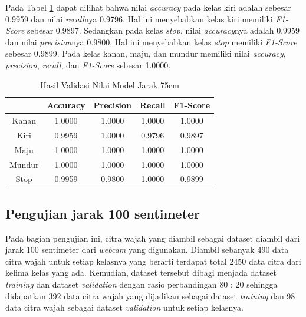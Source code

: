 Pada Tabel \ref{tb:Hasil Validasi Nilai Model Jarak 75cm} dapat dilihat bahwa nilai \emph{accuracy} pada kelas kiri adalah sebesar 0.9959 dan nilai \emph{recall}nya 0.9796. Hal ini menyebabkan kelas kiri memiliki \emph{F1-Score} sebesar 0.9897. Sedangkan pada kelas \emph{stop}, nilai \emph{accuracy}nya adalah 0.9959 dan nilai \emph{precision}nya 0.9800. Hal ini menyebabkan kelas \emph{stop} memiliki \emph{F1-Score} sebesar 0.9899. Pada kelas kanan, maju, dan mundur memiliki nilai \emph{accuracy}, \emph{precision}, \emph{recall}, dan \emph{F1-Score} sebesar 1.0000. 


\begin{table}[H]
  \centering
  \caption{Hasil Validasi Nilai Model Jarak 75cm}
  \label{tb:Hasil Validasi Nilai Model Jarak 75cm}
\begin{tabular}{|c|c|c|c|c|}
  \hline
  \rowcolor[HTML]{C0C0C0} 
  \cellcolor[HTML]{C0C0C0} & Accuracy & Precision & Recall & F1-Score \\ \hline
  Kanan                    & 1.0000   & 1.0000      & 1.0000 & 1.0000   \\ \hline
  Kiri                     & 0.9959   & 1.0000      & 0.9796 & 0.9897   \\ \hline
  Maju                     & 1.0000   & 1.0000      & 1.0000 & 1.0000   \\ \hline
  Mundur                   & 1.0000   & 1.0000      & 1.0000 & 1.0000   \\ \hline
  Stop                     & 0.9959   & 0.9800      & 1.0000 & 0.9899   \\ \hline
  \end{tabular}
  \end{table}

\subsection{Pengujian jarak 100 sentimeter}
Pada bagian pengujian ini, citra wajah yang diambil sebagai dataset diambil dari jarak 100 sentimeter dari \emph{webcam} yang digunakan. Diambil sebanyak 490 data citra wajah untuk setiap kelasnya yang berarti terdapat total 2450 data citra dari kelima kelas yang ada. Kemudian, dataset tersebut dibagi menjada dataset \emph{training} dan dataset \emph{validation} dengan rasio perbandingan 80 : 20 sehingga didapatkan 392 data citra wajah yang dijadikan sebagai dataset \emph{training} dan 98 data citra wajah sebagai dataset \emph{validation} untuk setiap kelasnya.

